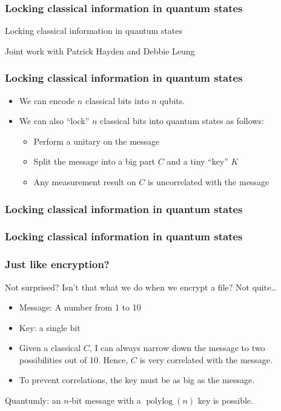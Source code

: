 \documentclass[12pt]{beamer}
\DeclareMathOperator{\polylog}{polylog}
\begin{document}
\begin{frame}
	\frametitle{Locking classical information in quantum states}
	\begin{center}
	\Huge Locking classical information in quantum states
	\end{center}
	Joint work with Patrick Hayden and Debbie Leung
\end{frame}

\begin{frame}
	\frametitle{Locking classical information in quantum states}
	\begin{itemize}
	\item We can encode $n$ classical bits into $n$ qubits.
	\item We can also ``lock'' $n$ classical bits into quantum states as follows:
	\begin{itemize}
	\item Perform a unitary on the message
	\item Split the message into a big part $C$ and a tiny ``key'' $K$
	\item Any measurement result on $C$ is uncorrelated with the message
	\end{itemize}
	\end{itemize}
\end{frame}

\begin{frame}
	\frametitle{Locking classical information in quantum states}
    \begin{figure}
    \scalebox{0.9}{}
    \end{figure}
\end{frame}

\begin{frame}
	\frametitle{Locking classical information in quantum states}
    \begin{figure}
    \scalebox{0.9}{}
    \end{figure}
\end{frame}

\begin{frame}
	\frametitle{Just like encryption?}
	Not surprised? Isn't that what we do when we encrypt a file? Not quite\ldots
	\begin{itemize}
	\item Message: A number from 1 to 10
	\item Key: a single bit
	\item Given a classical $C$, I can always narrow down the message to two possibilities out of 10. Hence, $C$ is very correlated with the message.
	\item To prevent correlations, the key must be as big as the message.
	\end{itemize}
	Quantumly: an $n$-bit message with a $\polylog(n)$ key is possible.
\end{frame}
\end{document}
